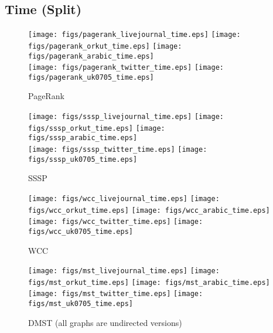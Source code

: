 \documentclass{article}
\newcommand{\bline}[1][1]{\vspace{#1\baselineskip}}
\begin{document}
\subsection{Time (Split)}
\begin{figure}[!h]
  \centering
  \texttt{[image: figs/pagerank\_livejournal\_time.eps]}\hspace{1em}%
  \texttt{[image: figs/pagerank\_orkut\_time.eps]}\hspace{1em}%
  \texttt{[image: figs/pagerank\_arabic\_time.eps]}\\
  \texttt{[image: figs/pagerank\_twitter\_time.eps]}\hspace{1em}%
  \texttt{[image: figs/pagerank\_uk0705\_time.eps]}
  \caption{PageRank}
\end{figure}

\begin{figure}[!h]
  \bline[3.5]
  \centering
  \texttt{[image: figs/sssp\_livejournal\_time.eps]}\hspace{1em}%
  \texttt{[image: figs/sssp\_orkut\_time.eps]}\hspace{1em}%
  \texttt{[image: figs/sssp\_arabic\_time.eps]}\\
  \texttt{[image: figs/sssp\_twitter\_time.eps]}\hspace{1em}%
  \texttt{[image: figs/sssp\_uk0705\_time.eps]}
  \caption{SSSP}
\end{figure}

\begin{figure}[!h]
  \bline[3.5]
  \centering
  \texttt{[image: figs/wcc\_livejournal\_time.eps]}\hspace{1em}%
  \texttt{[image: figs/wcc\_orkut\_time.eps]}\hspace{1em}%
  \texttt{[image: figs/wcc\_arabic\_time.eps]}\\
  \texttt{[image: figs/wcc\_twitter\_time.eps]}\hspace{1em}%
  \texttt{[image: figs/wcc\_uk0705\_time.eps]}
  \caption{WCC}
\end{figure}

\begin{figure}[!h]
  \bline[3.5]
  \centering
  \texttt{[image: figs/mst\_livejournal\_time.eps]}\hspace{1em}%
  \texttt{[image: figs/mst\_orkut\_time.eps]}\hspace{1em}%
  \texttt{[image: figs/mst\_arabic\_time.eps]}\\
  \texttt{[image: figs/mst\_twitter\_time.eps]}\hspace{1em}%
  \texttt{[image: figs/mst\_uk0705\_time.eps]}
  \caption{DMST (all graphs are undirected versions)}
\end{figure}
\end{document}
